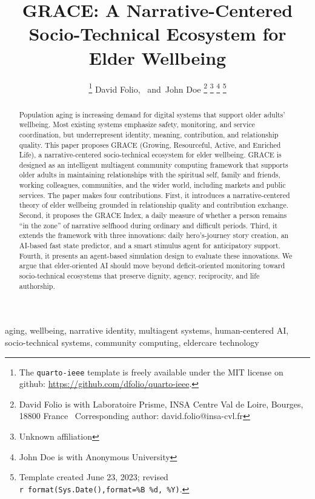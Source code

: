 \documentclass[
  journal,
]{IEEEtran}%
\title{GRACE: A Narrative-Centered Socio-Technical Ecosystem for Elder
Wellbeing}
\author{
\thanks{The \texttt{quarto-ieee} template is freely available under the
MIT license on github: \url{https://github.com/dfolio/quarto-ieee}.}
David Folio\orcidlink{0000-0001-9430-6091},~\IEEEmembership{Member,
IEEE}
and~John Doe%
\thanks{David Folio is with Laboratoire Prisme, INSA Centre Val de
Loire, Bourges, 18800 France%
  Corresponding author: david.folio@insa-cvl.fr
}
\thanks{Unknown affiliation}
\thanks{John Doe is with Anonymous University%
}
\thanks{Template created June 23, 2023; revised
\texttt{r\ format(Sys.Date(),format=\textquotesingle{}\%B\ \%d,\ \%Y\textquotesingle{})}.}
}
\begin{document}


\maketitle

\begin{abstract}
Population aging is increasing demand for digital systems that support
older adults' wellbeing. Most existing systems emphasize safety,
monitoring, and service coordination, but underrepresent identity,
meaning, contribution, and relationship quality. This paper proposes
GRACE (Growing, Resourceful, Active, and Enriched Life), a
narrative-centered socio-technical ecosystem for elder wellbeing. GRACE
is designed as an intelligent multiagent community computing framework
that supports older adults in maintaining relationships with the
spiritual self, family and friends, working colleagues, communities, and
the wider world, including markets and public services. The paper makes
four contributions. First, it introduces a narrative-centered theory of
elder wellbeing grounded in relationship quality and contribution
exchange. Second, it proposes the GRACE Index, a daily measure of
whether a person remains ``in the zone'' of narrative selfhood during
ordinary and difficult periods. Third, it extends the framework with
three innovations: daily hero's-journey story creation, an AI-based fast
state predictor, and a smart stimulus agent for anticipatory support.
Fourth, it presents an agent-based simulation design to evaluate these
innovations. We argue that elder-oriented AI should move beyond
deficit-oriented monitoring toward socio-technical ecosystems that
preserve dignity, agency, reciprocity, and life authorship.
\end{abstract}
\begin{IEEEkeywords}
aging, wellbeing, narrative identity, multiagent systems, human-centered
AI, socio-technical systems, community computing, eldercare technology
\end{IEEEkeywords}

%
\end{document}
